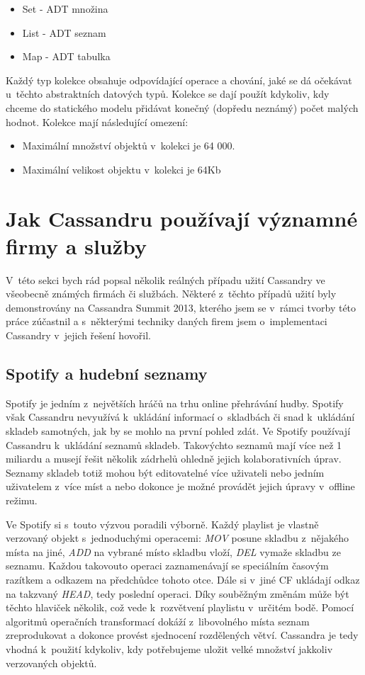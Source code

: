 \begin{itemize}
\item Set - ADT množina
\item List - ADT seznam
\item Map - ADT tabulka
\end{itemize}

Každý typ kolekce obsahuje odpovídající operace a chování, jaké se dá očekávat u~těchto abstraktních datových typů. Kolekce se dají použít kdykoliv, kdy chceme do statického modelu přidávat konečný (dopředu neznámý) počet malých hodnot. Kolekce mají následující omezení: 

\begin{itemize}
\item Maximální množství objektů v~kolekci je 64 000.
\item Maximální velikost objektu v~kolekci je 64Kb
\end{itemize}

\section{Jak Cassandru používají významné firmy a služby}

V~této sekci bych rád popsal několik reálných případu užití Cassandry ve všeobecně známých firmách či službách. Některé z~těchto případů užití byly demonstrovány na Cassandra Summit 2013, kterého jsem se v~rámci tvorby této práce zúčastnil a s~některými techniky daných firem jsem o~implementaci Cassandry v~jejich řešení hovořil. 

\subsection{Spotify a hudební seznamy}
Spotify je jedním z~největších hráčů na trhu online přehrávání hudby. Spotify však Cassandru nevyužívá k~ukládání informací o~skladbách či snad k~ukládání skladeb samotných, jak by se mohlo na první pohled zdát. Ve Spotify používají Cassandru k~ukládání seznamů skladeb. Takovýchto seznamů mají více než 1 miliardu a musejí řešit několik zádrhelů ohledně jejich kolaborativních úprav. Seznamy skladeb totiž mohou být editovatelné více uživateli nebo jedním uživatelem z~více míst a nebo dokonce je možné provádět jejich úpravy v~offline režimu. 

Ve Spotify si s~touto výzvou poradili výborně. Každý playlist je vlastně verzovaný objekt s~jednoduchými operacemi: \emph{MOV} posune skladbu z~nějakého místa na jiné, \emph{ADD} na vybrané místo skladbu vloží, \emph{DEL} vymaže skladbu ze seznamu. Každou takovouto operaci zaznamenávají se speciálním časovým razítkem a odkazem na předchůdce tohoto otce. Dále si v~jiné CF ukládají odkaz na takzvaný \emph{HEAD}, tedy poslední operaci. Díky souběžným změnám může být těchto hlaviček několik, což vede k~rozvětvení playlistu v~určitém bodě. Pomocí algoritmů operačních transformací dokáží z~libovolného místa seznam zreprodukovat a dokonce provést sjednocení rozdělených větví. Cassandra je tedy vhodná k~použití kdykoliv, kdy potřebujeme uložit velké množství jakkoliv verzovaných objektů. 

